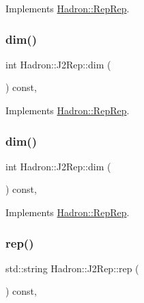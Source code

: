 Implements \mbox{\hyperlink{structHadron_1_1RepRep_a92c8802e5ed7afd7da43ccfd5b7cd92b}{Hadron\+::\+Rep\+Rep}}.

\mbox{\label{structHadron_1_1J2Rep_a9bbfe6d82db1e96beda068411ff79371}} 
\subsubsection{\texorpdfstring{dim()}{dim()}\hspace{0.1cm}{\footnotesize\ttfamily [2/3]}}
{\footnotesize\ttfamily int Hadron\+::\+J2\+Rep\+::dim (\begin{DoxyParamCaption}{ }\end{DoxyParamCaption}) const\hspace{0.3cm}{\ttfamily [inline]}, {\ttfamily [virtual]}}



Implements \mbox{\hyperlink{structHadron_1_1RepRep_a92c8802e5ed7afd7da43ccfd5b7cd92b}{Hadron\+::\+Rep\+Rep}}.

\mbox{\label{structHadron_1_1J2Rep_a9bbfe6d82db1e96beda068411ff79371}} 
\subsubsection{\texorpdfstring{dim()}{dim()}\hspace{0.1cm}{\footnotesize\ttfamily [3/3]}}
{\footnotesize\ttfamily int Hadron\+::\+J2\+Rep\+::dim (\begin{DoxyParamCaption}{ }\end{DoxyParamCaption}) const\hspace{0.3cm}{\ttfamily [inline]}, {\ttfamily [virtual]}}



Implements \mbox{\hyperlink{structHadron_1_1RepRep_a92c8802e5ed7afd7da43ccfd5b7cd92b}{Hadron\+::\+Rep\+Rep}}.

\mbox{\label{structHadron_1_1J2Rep_ae377be8f84efb218c8a07db0d4d5bb01}} 
\subsubsection{\texorpdfstring{rep()}{rep()}\hspace{0.1cm}{\footnotesize\ttfamily [1/3]}}
{\footnotesize\ttfamily std\+::string Hadron\+::\+J2\+Rep\+::rep (\begin{DoxyParamCaption}{ }\end{DoxyParamCaption}) const\hspace{0.3cm}{\ttfamily [inline]}, {\ttfamily [virtual]}}



